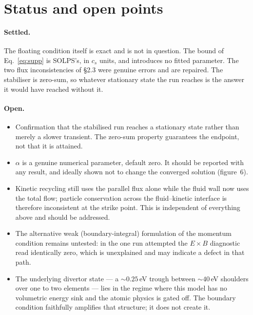 \documentclass[11pt,a4paper]{article}
\newcommand{\cs}{c_s}
\begin{document}
\section{Status and open points}

\paragraph{Settled.} The floating condition itself is exact and is not in question. The bound of
Eq.~\eqref{eq:supp} is SOLPS's, in $\cs$ units, and introduces no fitted parameter. The two flux
inconsistencies of \S2.3 were genuine errors and are repaired. The stabiliser is zero-sum, so
whatever stationary state the run reaches is the answer it would have reached without it.

\paragraph{Open.}
\begin{itemize}\itemsep2pt
\item Confirmation that the stabilised run reaches a stationary state rather than merely a slower
transient. The zero-sum property guarantees the endpoint, not that it is attained.
\item $\alpha$ is a genuine numerical parameter, default zero. It should be reported with any
result, and ideally shown not to change the converged solution (figure~6).
\item Kinetic recycling still uses the parallel flux alone while the fluid wall now uses the total
flow; particle conservation across the fluid--kinetic interface is therefore inconsistent at the
strike point. This is independent of everything above and should be addressed.
\item The alternative weak (boundary-integral) formulation of the momentum condition remains
untested: in the one run attempted the $E\times B$ diagnostic read identically zero, which is
unexplained and may indicate a defect in that path.
\item The underlying divertor state --- a $\sim\!0.25$\,eV trough between $\sim\!40$\,eV shoulders
over one to two elements --- lies in the regime where this model has no volumetric energy sink and
the atomic physics is gated off. The boundary condition faithfully amplifies that structure; it
does not create it.
\end{itemize}
\end{document}
